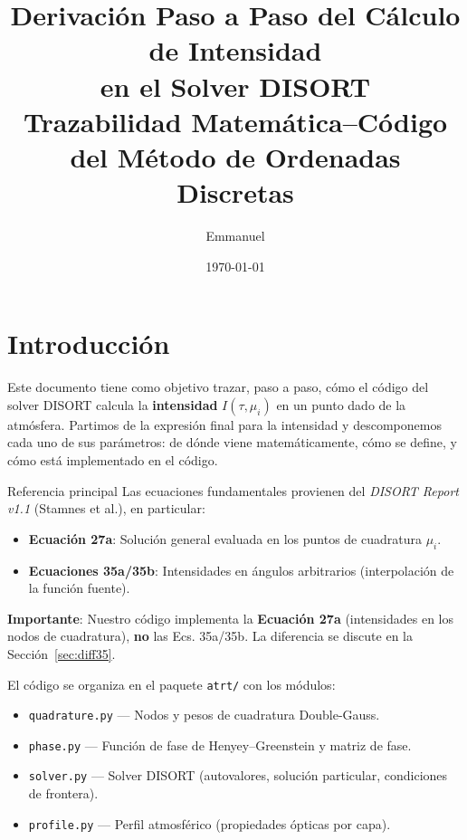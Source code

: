 \documentclass[a4paper,11pt]{article}
\title{\textbf{Derivaci\'on Paso a Paso del C\'alculo de Intensidad\\en el Solver DISORT}\\[0.5cm]
\large Trazabilidad Matem\'atica--C\'odigo del M\'etodo de Ordenadas Discretas}
\author{Emmanuel}
\date{\today}
\begin{document}
\maketitle
\tableofcontents
\newpage

\section{Introducci\'on}
\label{sec:intro}

Este documento tiene como objetivo trazar, paso a paso, c\'omo el c\'odigo del solver DISORT calcula la \textbf{intensidad} $I(\tau, \mu_i)$ en un punto dado de la atm\'osfera.  Partimos de la expresi\'on final para la intensidad y descomponemos cada uno de sus par\'ametros: de d\'onde viene matem\'aticamente, c\'omo se define, y c\'omo est\'a implementado en el c\'odigo.

\begin{concept}{Referencia principal}
Las ecuaciones fundamentales provienen del \textit{DISORT Report v1.1} (Stamnes et al.), en particular:
\begin{itemize}
\item \textbf{Ecuaci\'on 27a}: Soluci\'on general evaluada en los puntos de cuadratura $\mu_i$.
\item \textbf{Ecuaciones 35a/35b}: Intensidades en \'angulos arbitrarios (interpolaci\'on de la funci\'on fuente).
\end{itemize}
\textbf{Importante}: Nuestro c\'odigo implementa la \textbf{Ecuaci\'on 27a} (intensidades en los nodos de cuadratura), \textbf{no} las Ecs. 35a/35b. La diferencia se discute en la Secci\'on~\ref{sec:diff35}.
\end{concept}

El c\'odigo se organiza en el paquete \texttt{atrt/} con los m\'odulos:
\begin{itemize}
\item \texttt{quadrature.py} --- Nodos y pesos de cuadratura Double-Gauss.
\item \texttt{phase.py} --- Funci\'on de fase de Henyey--Greenstein y matriz de fase.
\item \texttt{solver.py} --- Solver DISORT (autovalores, soluci\'on particular, condiciones de frontera).
\item \texttt{profile.py} --- Perfil atmosf\'erico (propiedades \'opticas por capa).
\end{itemize}
\end{document}
